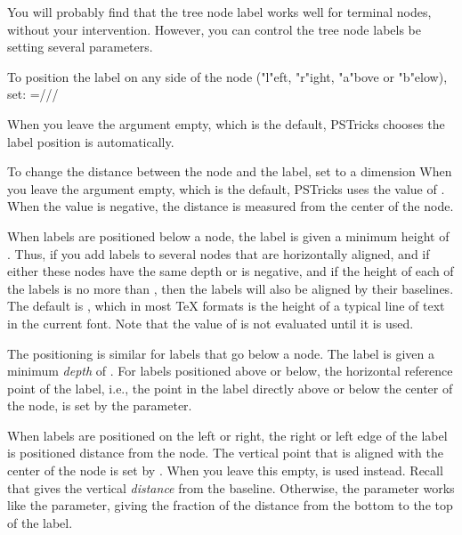 \documentclass[11pt,english,BCOR10mm,DIV12,bibliography=totoc,parskip=false,smallheadings
    headexclude,footexclude,oneside]{pst-doc}
\begin{document}
You will probably find that the tree node label works well for terminal nodes,
without your intervention. However, you can control the tree node labels be
setting several parameters.

To position the label on any side of the node ("l"eft, "r"ight, "a"bove or
"b"elow), set:  =///

\begin{LTXexample}[pos=l,width=0.4\linewidth]
\end{LTXexample}

When you leave the argument empty, which is the default, PSTricks chooses the
label position is automatically.

To change the distance between the node and the label, set  to a dimension
When you leave the argument empty, which is the default, PSTricks uses the
value of . When the value is negative, the distance is measured
from the center of the node.

When labels are positioned below a node, the label is given a minimum height
of .
Thus, if you add labels to several nodes that are horizontally aligned, and if
either these nodes have the same depth or  is negative, and if the
height of each of the labels is no more than , then the labels
will also be aligned by their baselines. The default is , which
in most \TeX{} formats is the height of a typical line of text in the current
font. Note that the value of  is not evaluated until it is used.

The positioning is similar for labels that go below a node. The label is given
a minimum \emph{depth} of .
For labels positioned above or below, the horizontal reference point of the
label, i.e., the point in the label directly above or below the center of the
node, is set by the  parameter.

When labels are positioned on the left or right, the right or left edge of the
label is positioned distance  from the node. The vertical point that
is aligned with the center of the node is set by .
When you leave this empty,  is used instead. Recall that 
gives the vertical \emph{distance} from the baseline. Otherwise, the
 parameter works like the  parameter, giving the fraction of
the distance from the bottom to the top of the label.
\end{document}
